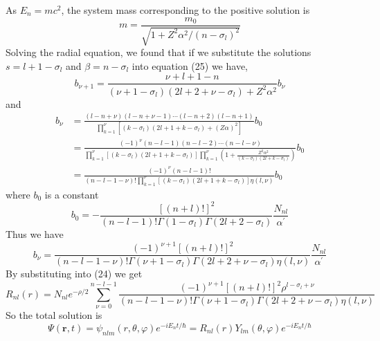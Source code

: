 \documentclass{article}
\begin{document}
As \(E_{n}=mc^{2}\), the system mass corresponding to the positive solution is 
\begin{equation}
m=\frac{m_{0}}{\sqrt{1+Z^{2} \alpha^{2} /\left(n-\sigma_{l}\right)^{2}}}
\end{equation}
Solving the radial equation, we found that if we substitute the solutions \(s=l+1-\sigma_{l}\) and \(\beta=n-\sigma_{l}\) into equation (25) we have,
\begin{equation}
b_{\nu+1}=\frac{\nu+l+1-n}{\left(\nu+1-\sigma_{l}\right)\left(2 l+2+\nu-\sigma_{l}\right)+Z^{2} \alpha^{2}} b_{\nu}
\end{equation}
and 
\begin{equation}
\begin{aligned} b_{\nu} &=\frac{(l-n+\nu)(l-n+\nu-1) \cdots(l-n+2)(l-n+1)}{\prod_{k=1}^{\nu}\left[\left(k-\sigma_{l}\right)\left(2 l+1+k-\sigma_{l}\right)+(Z \alpha)^{2}\right]} b_{0} \\ &=\frac{(-1)^{\nu}(n-l-1)(n-l-2) \cdots(n-l-\nu)}{\prod_{k=1}^{\nu}\left[\left(k-\sigma_{l}\right)\left(2 l+1+k-\sigma_{l}\right)\right] \prod_{k=1}^{\nu}\left(1+\frac{Z^{2} \alpha^{2}}{\left(k-\sigma_{l}\right)\left(2 l+k-\sigma_{l}\right)}\right)} b_{0} \\ &=\frac{(-1)^{\nu}(n-l-1) !}{(n-l-1-\nu) ! \prod_{k=1}^{\nu}\left[\left(k-\sigma_{l}\right)\left(2 l+1+k-\sigma_{l}\right)\right] \eta(l, \nu)} b_{0} \end{aligned}
\end{equation}
where \(b_0\) is a constant 
\begin{equation}
b_{0}=-\frac{[(n+l) !]^{2}}{(n-l-1) ! \Gamma\left(1-\sigma_{l}\right) \Gamma\left(2 l+2-\sigma_{l}\right)} \frac{N_{n l}}{\alpha^{\prime}}
\end{equation}
Thus we have
\begin{equation}
b_{\nu}=\frac{(-1)^{\nu+1}[(n+l) !]^{2}}{(n-l-1-\nu) ! \Gamma\left(\nu+1-\sigma_{l}\right) \Gamma\left(2 l+2+\nu-\sigma_{l}\right) \eta(l, \nu)} \frac{N_{n l}}{\alpha^{\prime}}
\end{equation}
By substituting into (24) we get
\begin{equation}
R_{n l}(r)=N_{n l} e^{-\rho / 2} \sum_{\nu=0}^{n-l-1} \frac{(-1)^{\nu+1}[(n+l) !]^{2} \rho^{l-\sigma_{l}+\nu}}{(n-l-1-\nu) ! \Gamma\left(\nu+1-\sigma_{l}\right) \Gamma\left(2 l+2+\nu-\sigma_{l}\right) \eta(l, \nu)}
\end{equation}
So the total solution is 
\begin{equation}
\Psi(\mathbf{r}, t)=\psi_{n l m}(r, \theta, \varphi) e^{-i E_{n} t / \hbar}=R_{n l}(r) Y_{l m}(\theta, \varphi) e^{-i E_{n} t / \hbar}
\end{equation}
\end{document}
